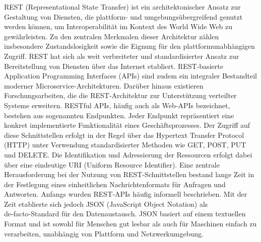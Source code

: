 REST (Representational State Transfer) ist ein architektonischer Ansatz zur Gestaltung von Diensten, die plattform‑ und umgebungsübergreifend genutzt werden können, um Interoperabilität im Kontext des World Wide Web zu gewährleisten. Zu den zentralen Merkmalen dieser Architektur zählen insbesondere Zustandslosigkeit sowie die Eignung für den plattformunabhängigen Zugriff. REST hat sich als weit verbreiteter und standardisierter Ansatz zur Bereitstellung von Diensten über das Internet etabliert. REST‑basierte Application Programming Interfaces (APIs) sind zudem ein integraler Bestandteil moderner Microservice‑Architekturen. Darüber hinaus existieren Forschungsarbeiten, die die REST‑Architektur zur Unterstützung verteilter Systeme erweitern.
RESTful APIs, häufig auch als Web‑APIs bezeichnet, bestehen aus sogenannten Endpunkten. Jeder Endpunkt repräsentiert eine konkret implementierte Funktionalität eines Geschäftsprozesses. Der Zugriff auf diese Schnittstellen erfolgt in der Regel über das Hypertext Transfer Protocol (HTTP) unter Verwendung standardisierter Methoden wie GET, POST, PUT und DELETE. Die Identifikation und Adressierung der Ressourcen erfolgt dabei über eine eindeutige URI (Uniform Resource Identifier).
Eine zentrale Herausforderung bei der Nutzung von REST‑Schnittstellen bestand lange Zeit in der Festlegung eines einheitlichen Nachrichtenformats für Anfragen und Antworten. Anfangs wurden REST‑APIs häufig informell beschrieben. Mit der Zeit etablierte sich jedoch JSON (JavaScript Object Notation) als de‑facto‑Standard für den Datenaustausch. JSON basiert auf einem textuellen Format und ist sowohl für Menschen gut lesbar als auch für Maschinen einfach zu verarbeiten, unabhängig von Plattform und Netzwerkumgebung. \cite{masse2011rest}







\cite{akafuah2016evolution}
\cite{tisza2013advanced}




